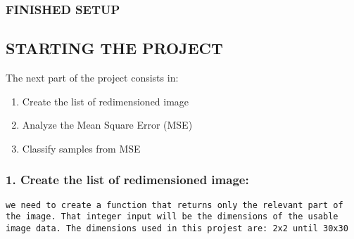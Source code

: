 \documentclass[11pt]{article}
\providecommand{\tightlist}{%
      \setlength{\itemsep}{0pt}\setlength{\parskip}{0pt}}
\begin{document}
    \subsubsection{FINISHED SETUP}\label{finished-setup}

    \subsection{STARTING THE PROJECT}\label{starting-the-project}

    The next part of the project consists in:

\begin{enumerate}
\def\labelenumi{\arabic{enumi}.}
\tightlist
\item
  Create the list of redimensioned image
\item
  Analyze the Mean Square Error (MSE)
\item
  Classify samples from MSE
\end{enumerate}

    \subsubsection{1. Create the list of redimensioned
image:}\label{create-the-list-of-redimensioned-image}

\begin{verbatim}
we need to create a function that returns only the relevant part of the image. That integer input will be the dimensions of the usable image data. The dimensions used in this projest are: 2x2 until 30x30
\end{verbatim}
\end{document}
